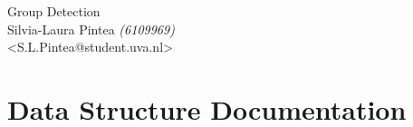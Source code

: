 \documentclass[a4paper]{book}
\begin{document}
\normalfont\normalsize
\hypersetup{pageanchor=false}
\begin{titlepage}
\vspace*{7cm}
\begin{center}
{\Large Group Detection}\\
\vspace*{1cm}
{\large Silvia-Laura Pintea \emph{(6109969)}}\\
\vspace*{0.5cm}
{\small <S.L.Pintea@student.uva.nl>}\\
\end{center}
\end{titlepage}
\clearemptydoublepage
{}
\tableofcontents
\clearemptydoublepage
{}
\hypersetup{pageanchor=true}
\chapter{Data Structure Documentation}















\printindex
\end{document}
